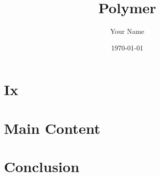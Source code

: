 \documentclass{article}
\title{Polymer}
\author{Your Name}
\date{\today}
\begin{document}
\maketitle

\section{Ix}


\section{Main Content}


\section{Conclusion}

\end{document}
